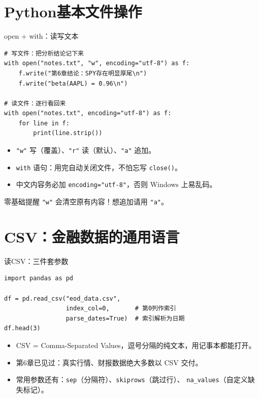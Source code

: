 \documentclass[9pt]{ctexbeamer}
\begin{document}
\section{Python基本文件操作}

\begin{frame}[fragile]{open + with：读写文本}
	\begin{lstlisting}
# 写文件：把分析结论记下来
with open("notes.txt", "w", encoding="utf-8") as f:
    f.write("第6章结论：SPY存在明显厚尾\n")
    f.write("beta(AAPL) = 0.96\n")

# 读文件：逐行看回来
with open("notes.txt", encoding="utf-8") as f:
    for line in f:
        print(line.strip())
\end{lstlisting}
	\begin{itemize}
		\item \texttt{"w"} 写（覆盖）、\texttt{"r"} 读（默认）、\texttt{"a"} 追加。
		\item \texttt{with} 语句：用完自动关闭文件，不怕忘写 \texttt{close()}。
		\item 中文内容务必加 \texttt{encoding="utf-8"}，否则 Windows 上易乱码。
	\end{itemize}
	\begin{alertblock}{零基础提醒}
		\texttt{"w"} 会\alert{清空}原有内容！想追加请用 \texttt{"a"}。
	\end{alertblock}
\end{frame}


\section{CSV：金融数据的通用语言}

\begin{frame}[fragile]{读CSV：三件套参数}
	\begin{lstlisting}
import pandas as pd

df = pd.read_csv("eod_data.csv",
                 index_col=0,       # 第0列作索引
                 parse_dates=True)  # 索引解析为日期
df.head(3)
\end{lstlisting}
	\begin{itemize}
		\item CSV = Comma-Separated Values，逗号分隔的纯文本，用记事本都能打开。
		\item 第6章已见过：真实行情、财报数据绝大多数以 CSV 交付。
		\item 常用参数还有：\texttt{sep}（分隔符）、\texttt{skiprows}（跳过行）、
			\texttt{na\_values}（自定义缺失标记）。
	\end{itemize}
\end{frame}
\end{document}
